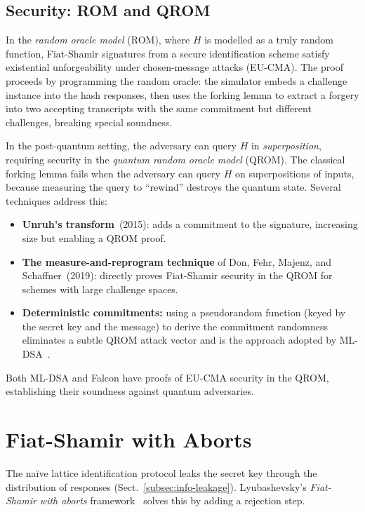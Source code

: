 \subsection{Security: ROM and QROM}
\label{subsec:rom-qrom}

In the \emph{random oracle model} (ROM), where $H$ is modelled as a truly random function, Fiat-Shamir signatures from a secure identification scheme satisfy existential unforgeability under chosen-message attacks (EU-CMA).  The proof proceeds by programming the random oracle: the simulator embeds a challenge instance into the hash responses, then uses the forking lemma to extract a forgery into two accepting transcripts with the same commitment but different challenges, breaking special soundness.

In the post-quantum setting, the adversary can query $H$ in \emph{superposition}, requiring security in the \emph{quantum random oracle model} (QROM).  The classical forking lemma fails when the adversary can query $H$ on superpositions of inputs, because measuring the query to ``rewind'' destroys the quantum state.  Several techniques address this:

\begin{itemize}
\item \textbf{Unruh's transform}~(2015): adds a commitment to the signature, increasing size but enabling a QROM proof.
\item \textbf{The measure-and-reprogram technique} of Don, Fehr, Majenz, and Schaffner~(2019): directly proves Fiat-Shamir security in the QROM for schemes with large challenge spaces.
\item \textbf{Deterministic commitments:} using a pseudorandom function (keyed by the secret key and the message) to derive the commitment randomness eliminates a subtle QROM attack vector and is the approach adopted by ML-DSA~\cite{FIPS204}.
\end{itemize}

Both ML-DSA and Falcon have proofs of EU-CMA security in the QROM, establishing their soundness against quantum adversaries.


\section{Fiat-Shamir with Aborts}
\label{sec:fs-aborts}

The na\"ive lattice identification protocol leaks the secret key through the distribution of responses (Sect.~\ref{subsec:info-leakage}).  Lyubashevsky's \emph{Fiat-Shamir with aborts} framework~\cite{Lyubashevsky2012} solves this by adding a rejection step.

